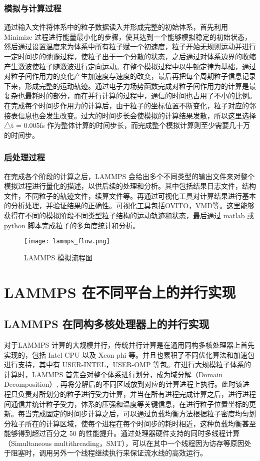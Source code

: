 \subsubsection{模拟与计算过程}
通过输入文件将体系中的粒子数据读入并形成完整的初始体系，首先利用Minimize 过程进行能量最小化的步骤，使其达到一个能够模拟稳定的初始状态，然后通过设置温度来为体系中所有粒子赋一个初速度，粒子开始无规则运动并进行一定时间步的弛豫过程，使粒子出于一个分散的状态，之后通过对体系边界的收缩产生激波使粒子随激波进行定向运动。在整个模拟过程中以牛顿定律为基础，通过对粒子间作用力的变化产生加速度与速度的改变，最后再把每个周期粒子信息记录下来，形成完整的运动轨迹。通过电子力场势函数完成对粒子间作用力的计算是最复杂也最耗时的部分，而在并行计算的过程中，通信的时间也占用了不小的比例。在完成每个时间步作用力的计算后，由于粒子的坐标位置不断变化，粒子对应的邻接表信息也会发生改变。过大的时间步长会使模拟的计算结果发散，所以这里选择△t = 0.005fs 作为整体计算的时间步长，而完成整个模拟计算则至少需要几十万的时间步。

\subsubsection{后处理过程}
在完成各个阶段的计算之后，LAMMPS 会给出多个不同类型的输出文件来对整个模拟过程进行量化的描述，以供后续的处理和分析。其中包括结果日志文件，结构文件，不同粒子的轨迹文件，续算文件等。再通过可视化工具对计算结果进行基本的分析处理，并验证结果的正确性。可视化工具包括OVITO，VMD等。这里能够获得在不同的模拟阶段不同类型粒子结构的运动轨迹和状态，最后通过 matlab 或 python 脚本完成粒子的多角度统计和分析。

 \begin{figure}[h]
  \centering
  \texttt{[image: lammps\_flow.png]}
  \caption{LAMMPS 模拟流程图}
\end{figure}

\section{LAMMPS 在不同平台上的并行实现}
\subsection{LAMMPS 在同构多核处理器上的并行实现}
对于LAMMPS 计算的大规模并行，传统并行计算是在通用同构多核处理器上首先实现的，包括 Intel CPU 以及 Xeon phi 等。并且也累积了不同优化算法和加速包进行支持，其中有 USER-INTEL，USER-OMP 等包。在进行大规模粒子体系的计算时，LAMMPS 首先会对整个体系进行划分，成为域分解（Domain Decomposition）, 再将分解后的不同区域放到对应的计算进程上执行。此时该进程只负责对所划分的粒子进行受力计算，并当在所有进程完成计算之后，进行进程间通信并统计粒子受力，体系的压强和温度等关键信息，在进行粒子位置坐标的更新。每当完成固定的时间步计算之后，可以通过负载均衡方法根据粒子密度均匀划分粒子所在的计算区域，使每个进程在每个时间步的耗时相近，这种负载均衡甚至能够得到超过百分之 50 的性能提升。通过处理器硬件支持的同时多线程计算（Simultaneous multithreading，SMT），可以在其中一个线程因为访存等原因处于阻塞时，调用另外一个线程继续执行来保证流水线的高效运行。

